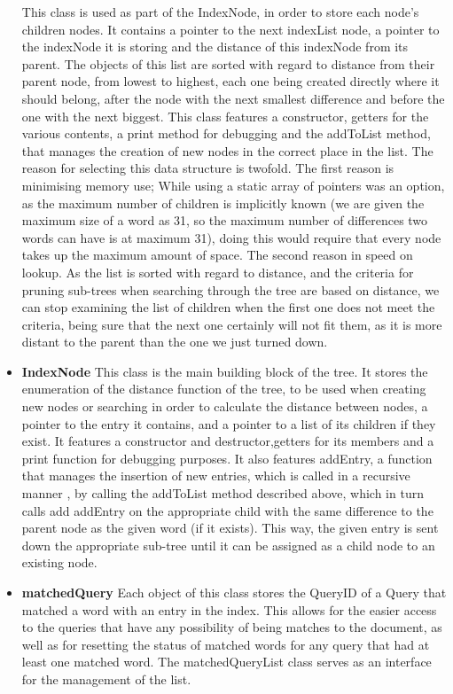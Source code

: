 \documentclass{article}
\begin{document}
\begin{itemize}
  This class is used as part of the IndexNode, in order to store each node's children nodes. It contains a pointer to the next indexList node, a pointer to the indexNode it is storing and the distance of this indexNode from its parent. The objects of this list are sorted with regard to distance from their parent node, from lowest to highest, each one being created directly where it should belong, after the node with the next smallest difference and before the one with the next biggest. This class features a constructor, getters for the various contents, a print method for debugging and the addToList method, that manages the creation of new nodes in the correct place in the list. The reason for selecting this data structure is twofold. The first reason is minimising memory use; While using a static array of pointers was an option, as the maximum number of children is implicitly known (we are given the maximum size of a word as 31, so the maximum number of differences two words can have is at maximum 31), doing this would require that every node takes up the maximum amount of space. The second reason in speed on lookup. As the list is sorted with regard to distance, and the criteria for pruning sub-trees when searching through the tree are based on distance, we can stop examining the list of children when the first one does not meet the criteria, being sure that the next one certainly will not fit them, as it is more distant to the parent than the one we just turned down. 
  \item \textbf{IndexNode}
  This class is the main building block of the tree. It stores the enumeration of the distance function of the tree, to be used when creating new nodes or searching in order to calculate the distance between nodes, a pointer to the entry it contains, and a pointer to a list of its children if they exist. It features a constructor and destructor,getters for its members and a print function for debugging purposes. It also features addEntry, a function that manages the insertion of new entries, which is called in a recursive manner , by calling the addToList method described above, which in turn calls add addEntry on the appropriate child with the same difference to the parent node as the given word (if it exists). This way, the given entry is sent down the appropriate sub-tree until it can be assigned as a child node to an existing node. 
   \item \textbf{matchedQuery}
   Each object of this class stores the QueryID of a Query that matched a word with an entry in the index. This allows for the easier access to the queries that have any possibility of being matches to the document, as well as for resetting the status of matched words for any query that had at least one matched word. The matchedQueryList class serves as an interface for the management of the list.
\end{itemize}
\end{document}

